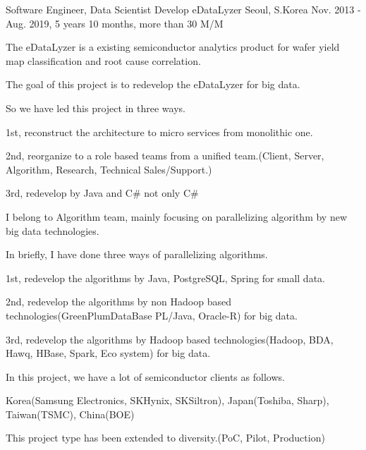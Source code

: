 

\begin{cventries}

  \cventry
    {Software Engineer, Data Scientist} %
    {Develop eDataLyzer} %
    {Seoul, S.Korea} %
    {Nov. 2013 - Aug. 2019, 5 years 10 months, more than 30 M/M} %
    {
      \begin{cvitems} %
        \item {The eDataLyzer is a existing semiconductor analytics product for wafer yield map classification and root cause correlation.}
        \item {The goal of this project is to redevelop the eDataLyzer for big data.}
        \item {So we have led this project in three ways.}
        \item {1st, reconstruct the architecture to micro services from monolithic one.}
        \item {2nd, reorganize to a role based teams from a unified team.(Client, Server, Algorithm, Research, Technical Sales/Support.)}
        \item {3rd, redevelop by Java and C\# not only C\#}
        \item {I belong to Algorithm team, mainly focusing on parallelizing algorithm by new big data technologies.}
        \item {In briefly, I have done three ways of parallelizing algorithms.}
        \item {1st, redevelop the algorithms by Java, PostgreSQL, Spring for small data.}
        \item {2nd, redevelop the algorithms by non Hadoop based technologies(GreenPlumDataBase PL/Java, Oracle-R) for big data.}
        \item {3rd, redevelop the algorithms by Hadoop based technologies(Hadoop, BDA, Hawq, HBase, Spark, Eco system) for big data.}
        \item {In this project, we have a lot of semiconductor clients as follows.}
        \item {Korea(Samsung Electronics, SKHynix, SKSiltron), Japan(Toshiba, Sharp), Taiwan(TSMC), China(BOE)}
        \item {This project type has been extended to diversity.(PoC, Pilot, Production)}
      \end{cvitems}
    }


\end{cventries}
